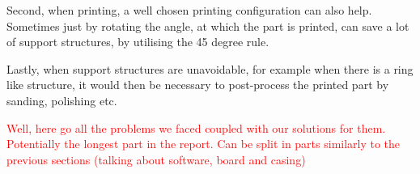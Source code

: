 \begin{enumerate}
\begin{itemize}
      Second, when printing, a well chosen printing configuration can also help. Sometimes just by rotating the angle, at which the part is printed, can save a lot of support structures, by utilising the 45 degree rule.
      
      Lastly, when support structures are unavoidable, for example when there is a ring like structure, it would then be necessary to post-process the printed part by sanding, polishing etc.
  \end{itemize}
\end{enumerate}

\textcolor{red}{
Well, here go all the problems we faced coupled with our solutions for them. Potentially the longest part in the report. Can be split in parts similarly to the previous sections (talking about software, board and casing)
}
